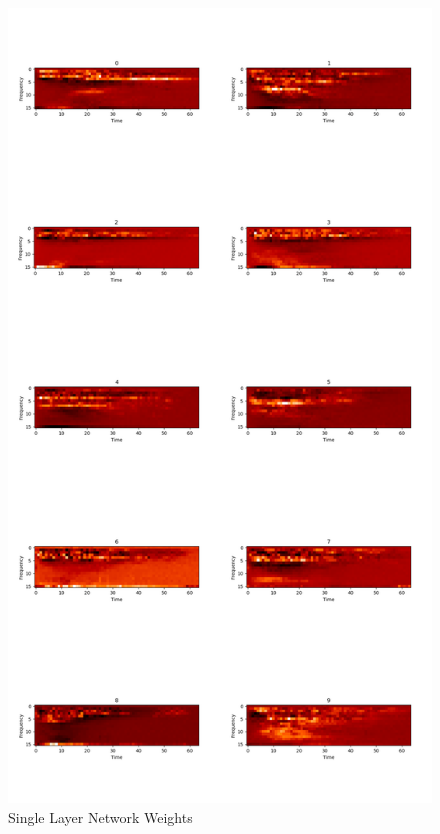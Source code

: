 \documentclass[10pt,a4paper]{report}
\begin{document}
\begin{figure}[H]
\centering
\includegraphics[scale=0.12]{nn_spec.png}
\caption{Single Layer Network Weights}
\label{fig:nn_spect}
\end{figure}
\end{document}
